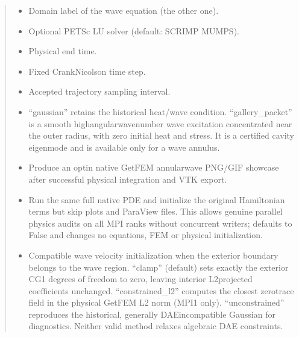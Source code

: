 \documentclass[letterpaper,10pt,english]{sphinxmanual}
\begin{document}
\begin{fulllineitems}
\begin{quote}
\begin{description}
\begin{itemize}
\item {} 
\sphinxAtStartPar
{} \textendash{} Domain label of the wave equation (the other one).

\item {} 
\sphinxAtStartPar
{} \textendash{} Optional PETSc LU solver (default: SCRIMP MUMPS).

\item {} 
\sphinxAtStartPar
{} \textendash{} Physical end time.

\item {} 
\sphinxAtStartPar
{} \textendash{} Fixed Crank\textendash{}Nicolson time step.

\item {} 
\sphinxAtStartPar
{} \textendash{} Accepted trajectory sampling interval.

\item {} 
\sphinxAtStartPar
{} \textendash{} “gaussian” retains the historical heat/wave
condition. “gallery\_packet” is a smooth high\sphinxhyphen{}angular\sphinxhyphen{}wavenumber
wave excitation concentrated near the outer radius, with
zero initial heat and stress. It is  a certified cavity
eigenmode and is available only for a wave annulus.

\item {} 
\sphinxAtStartPar
{} \textendash{} Produce an opt\sphinxhyphen{}in native GetFEM annular\sphinxhyphen{}wave PNG/GIF
showcase after successful physical integration and VTK export.

\item {} 
\sphinxAtStartPar
{} \textendash{} Run the same full native PDE and initialize the
original Hamiltonian terms but skip plots and ParaView files.
This allows genuine parallel physics audits on all MPI ranks
without concurrent writers; defaults to False and changes
no equations, FEM or physical initialization.

\item {} 
\sphinxAtStartPar
{} \textendash{} Compatible wave velocity initialization
when the exterior boundary belongs to the wave region. “clamp”
(default) sets exactly the exterior CG1 degrees of freedom to zero,
leaving interior L2\sphinxhyphen{}projected coefficients unchanged.
“constrained\_l2” computes the closest zero\sphinxhyphen{}trace field in the
physical GetFEM L2 norm (MPI1 only). “unconstrained” reproduces
the historical, generally DAE\sphinxhyphen{}incompatible Gaussian for diagnostics.
Neither valid method relaxes algebraic DAE constraints.


\end{itemize}
\end{description}
\end{quote}
\end{fulllineitems}
\end{document}
